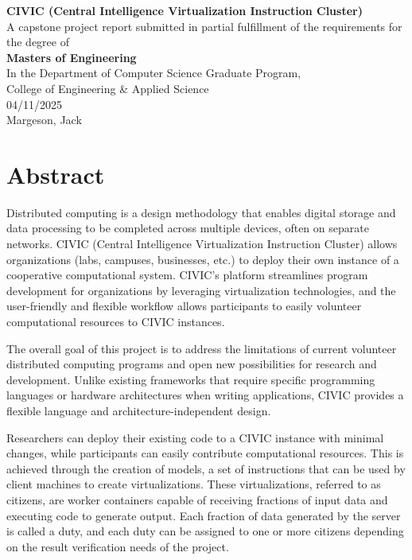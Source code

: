 \documentclass[11pt]{article}
\begin{document}
\thispagestyle{empty}
\begin{titlepage}
    \begin{center}
        \textbf{\Large CIVIC (Central Intelligence Virtualization Instruction Cluster)} \\[1cm]
        A capstone project report submitted in partial fulfillment of the requirements for the degree of \\[1cm]
        \textbf{\Large Masters of Engineering} \\[1cm]
        In the Department of Computer Science Graduate Program, \\
        College of Engineering \& Applied Science \\[1cm]
        04/11/2025 \\[1cm]
        Margeson, Jack
    \end{center}
\end{titlepage}

\setcounter{page}{2}
\section{Abstract}

Distributed computing is a design methodology that enables digital storage and data processing to be completed across multiple devices, often on separate networks. CIVIC (Central Intelligence Virtualization Instruction Cluster) allows organizations (labs, campuses, businesses, etc.) to deploy their own instance of a cooperative computational system. CIVIC’s platform streamlines program development for organizations by leveraging virtualization technologies, and the user-friendly and flexible workflow allows participants to easily volunteer computational resources to CIVIC instances.

The overall goal of this project is to address the limitations of current volunteer distributed computing programs and open new possibilities for research and development. Unlike existing frameworks that require specific programming languages or hardware architectures when writing applications, CIVIC provides a flexible language and architecture-independent design.

Researchers can deploy their existing code to a CIVIC instance with minimal changes, while participants can easily contribute computational resources. This is achieved through the creation of models, a set of instructions that can be used by client machines to create virtualizations. These virtualizations, referred to as citizens, are worker containers capable of receiving fractions of input data and executing code to generate output. Each fraction of data generated by the server is called a duty, and each duty can be assigned to one or more citizens depending on the result verification needs of the project.
\end{document}
